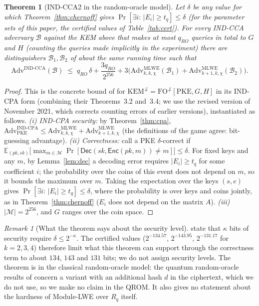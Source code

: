 \documentclass[11pt]{article}
\newtheorem{theorem}{Theorem}
\theoremstyle{remark}
\newtheorem{remark}{Remark}
\newcommand{\Rq}{R_q}
\begin{document}
\begin{theorem}[IND-CCA2 in the random-oracle model]\label{thm:cca}
Let $\delta$ be any value for which Theorem~\ref{thm:chernoff} gives $\Pr[\exists i:\,|E_i|\ge t_q]\le\delta$ (for the parameter sets of this paper, the certified values of Table~\ref{tab:cert}). For every IND-CCA adversary $\mathcal B$ against the KEM above that makes at most $q_{RO}$ queries in total to $G$ and $H$ (counting the queries made implicitly in the experiment) there are distinguishers $\mathcal B_1,\mathcal B_2$ of about the same running time such that
\[
\mathrm{Adv}^{\mathrm{IND\text{-}CCA}}(\mathcal B)\;\le\; q_{RO}\,\delta+\frac{3q_{RO}}{2^{256}}+3\Big(\mathrm{Adv}^{\mathrm{MLWE}}_{k,k,\chi}(\mathcal B_1)+\mathrm{Adv}^{\mathrm{MLWE}}_{k+1,k,\chi}(\mathcal B_2)\Big).
\]
\end{theorem}
\begin{proof}
This is the concrete bound of \cite[Section~3.3]{HHK17} for $\mathrm{KEM}^{\not\perp}=\mathrm{FO}^{\not\perp}[\mathrm{PKE},G,H]$ in its IND-CPA form (combining their Theorems~3.2 and~3.4; we use the revised version of November 2021, which corrects counting errors of earlier versions), instantiated as follows. \emph{(i) IND-CPA security:} by Theorem~\ref{thm:cpa}, $\mathrm{Adv}^{\mathrm{IND\text{-}CPA}}_{\mathrm{PKE}}\le\mathrm{Adv}^{\mathrm{MLWE}}_{k,k,\chi}+\mathrm{Adv}^{\mathrm{MLWE}}_{k+1,k,\chi}$ (the definitions of the game agree: bit-guessing advantage). \emph{(ii) Correctness:} \cite{HHK17} call a PKE $\delta$-correct if $\mathbb E_{(pk,sk)}\big[\max_{m\in\mathcal M}\Pr[\mathsf{Dec}(sk,\mathsf{Enc}(pk,m))\ne m]\big]\le\delta$. For fixed keys and any $m$, by Lemma~\ref{lem:dec} a decoding error requires $|E_i|\ge t_q$ for some coefficient $i$; the probability over the coins of this event does not depend on $m$, so it bounds the maximum over $m$. Taking the expectation over the keys $(s,e)$ gives $\Pr[\exists i:\,|E_i|\ge t_q]\le\delta$, where the probability is over keys and coins jointly, as in Theorem~\ref{thm:chernoff} ($E_i$ does not depend on the matrix $A$). \emph{(iii)} $|\mathcal M|=2^{256}$, and $G$ ranges over the coin space.
\end{proof}
\begin{remark}[What the theorem says about the security level]
\cite{HHK17} state that $\kappa$ bits of security require $\delta\le2^{-\kappa}$. The certified values ($2^{-134.57}$, $2^{-143.95}$, $2^{-131.17}$ for $k=2,3,4$) therefore limit what this theorem can support through the correctness term to about $134$, $143$ and $131$ bits; we do not assign security levels. The theorem is in the classical random-oracle model: the quantum random-oracle results of \cite{HHK17} concern a variant with an additional hash $d$ in the ciphertext, which we do not use, so we make no claim in the QROM. It also gives no statement about the hardness of Module-LWE over $\Rq$ itself.
\end{remark}
\end{document}
